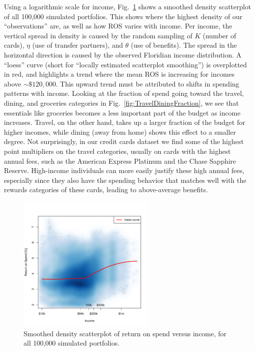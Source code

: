 Using a logarithmic scale for income, Fig.~\ref{fig:MC_ROS_vs_Income} shows a smoothed density scatterplot of all 100,000 simulated portfolios.  
This shows where the highest density of our ``observations'' are, as well as how ROS varies with income. 
Per income, the vertical spread in density is caused by the random sampling of $K$ (number of cards), $\eta$ (use of transfer partners), and $\theta$ (use of benefits).
The spread in the horizontal direction is caused by the observed Floridian income distribution.
A ``loess'' curve (short for ``locally estimated scatterplot smoothing'') is overplotted in red, and highlights a trend where the mean ROS is increasing for incomes above $\sim\$120,000$.
This upward trend must be attributed to shifts in spending patterns with income. 
Looking at the fraction of spend going toward the travel, dining, and groceries categories in Fig.~\ref{fig:TravelDiningFraction}, we see that essentials like groceries becomes a less important part of the budget as income increases.
Travel, on the other hand, takes up a larger fraction of the budget for higher incomes, while dining (away from home) shows this effect to a smaller degree. 
Not surprisingly, in our credit cards dataset we find some of the highest point multipliers on the travel categories, usually on cards with the highest annual fees, such as the American Express Platinum and the Chase Sapphire Reserve. 
High-income individuals can more easily justify these high annual fees, especially since they also have the spending behavior that matches well with the rewards categories of these cards, leading to above-average benefits.   

\begin{figure}[t!h]
    \begin{center}
    \includegraphics[width=0.6\textwidth]{../Figures/MC_ROS_vs_Income.pdf}
    \caption{Smoothed density scatterplot of return on spend versus income, for all 100,000 simulated portfolios.}
    \label{fig:MC_ROS_vs_Income}
    \end{center}
\end{figure}

